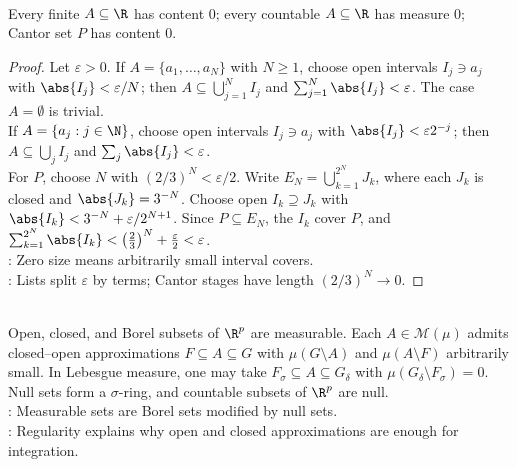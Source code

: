 \begin{proposition} \label{prop:finite-countable-cantor-null-sets} \\
Every finite $A\subseteq\R$ has content $0$; every countable $A\subseteq\R$ has measure $0$; Cantor set $P$ has content $0$.
\begin{proof}
Let $\varepsilon>0$. If $A=\{a_1,\ldots,a_N\}$ with $N\geq1$, choose open intervals $I_j\ni a_j$ with $\abs{I_j}<\varepsilon/N$; then $A\subseteq\bigcup_{j=1}^NI_j$ and $\sum_{j=1}^N\abs{I_j}<\varepsilon$. The case $A=\emptyset$ is trivial.\\
If $A=\{a_j:j\in\N\}$, choose open intervals $I_j\ni a_j$ with $\abs{I_j}<\varepsilon 2^{-j}$; then $A\subseteq\bigcup_jI_j$ and $\sum_j\abs{I_j}<\varepsilon$.\\
For $P$, choose $N$ with $(2/3)^N<\varepsilon/2$. Write $E_N=\bigcup_{k=1}^{2^N}J_k$, where each $J_k$ is closed and $\abs{J_k}=3^{-N}$. Choose open $I_k\supseteq J_k$ with $\abs{I_k}<3^{-N}+\varepsilon/2^{N+1}$. Since $P\subseteq E_N$, the $I_k$ cover $P$, and $\sum_{k=1}^{2^N}\abs{I_k}<\left(\frac23\right)^N+\frac{\varepsilon}{2}<\varepsilon$.\\
: Zero size means arbitrarily small interval covers.\\
: Lists split $\varepsilon$ by terms; Cantor stages have length $(2/3)^N\to0$.
\end{proof}
\end{proposition}

\begin{remark} \label{rem:borel-null-regular-measurable-sets} \\
Open, closed, and Borel subsets of $\R^p$ are measurable. Each $A\in\mathcal{M}(\mu)$ admits closed--open approximations $F\subseteq A\subseteq G$ with $\mu(G\setminus A)$ and $\mu(A\setminus F)$ arbitrarily small. In Lebesgue measure, one may take $F_\sigma\subseteq A\subseteq G_\delta$ with $\mu(G_\delta\setminus F_\sigma)=0$. Null sets form a $\sigma$-ring, and countable subsets of $\R^p$ are null.\\
: Measurable sets are Borel sets modified by null sets.\\
: Regularity explains why open and closed approximations are enough for integration.
\end{remark}
